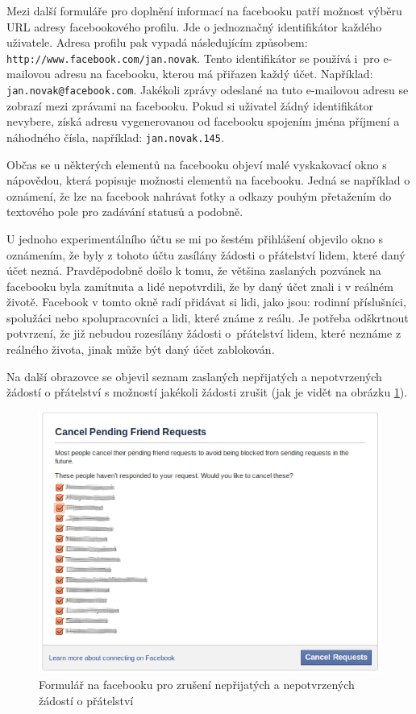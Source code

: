 \documentclass[thesis=M,czech]{FITthesis}[2013/05/10]
\begin{document}
Mezi další formuláře pro doplnění informací na facebooku patří možnost výběru URL adresy facebookového profilu. Jde o jednoznačný identifikátor každého uživatele. Adresa profilu pak vypadá následujícím způsobem: \verb|http://www.facebook.com/jan.novak|. Tento identifikátor se používá i~pro e-mailovou adresu na facebooku, kterou má přiřazen každý účet. Například: \verb|jan.novak@facebook.com|. Jakékoli zprávy odeslané na tuto e-mailovou adresu se zobrazí mezi zprávami na facebooku. Pokud si uživatel žádný identifikátor nevybere, získá adresu vygenerovanou od facebooku spojením jména příjmení a náhodného čísla, například: \verb|jan.novak.145|.

Občas se u některých elementů na facebooku objeví malé vyskakovací okno s nápovědou, která popisuje možnosti elementů na facebooku. Jedná se například o oznámení, že lze na facebook nahrávat fotky a odkazy pouhým přetažením do textového pole pro zadávání statusů a podobně. 

U jednoho experimentálního účtu se mi po šestém přihlášení  objevilo okno s oznámením, že byly z tohoto účtu zasílány žádosti o přátelství lidem, které daný účet nezná. Pravděpodobně došlo k tomu, že většina zaslaných pozvánek na facebooku byla zamítnuta a lidé nepotvrdili, že by daný účet znali i v reálném životě. Facebook v tomto okně radí přidávat si lidi, jako jsou: rodinní příslušníci, spolužáci nebo spolupracovníci a lidi, které známe z reálu. Je potřeba odškrtnout potvrzení, že již nebudou rozesílány žádosti o~přátelství lidem, které neznáme z reálného života, jinak může být daný účet zablokován.

Na další obrazovce se objevil seznam zaslaných nepřijatých a nepotvrzených žádostí o přátelství s možností jakékoli žádosti zrušit (jak je vidět na obrázku \ref{fig:cancelPendingFrinedRequests}).

\begin{figure}[h]
\begin{center}
\includegraphics[width=5in]{figures/cancelPendingFriendRequests.png}
\caption{Formulář na facebooku pro zrušení nepřijatých  a nepotvrzených žádostí o přátelství}
\label{fig:cancelPendingFrinedRequests}
\end{center}
\end{figure}
\end{document}

